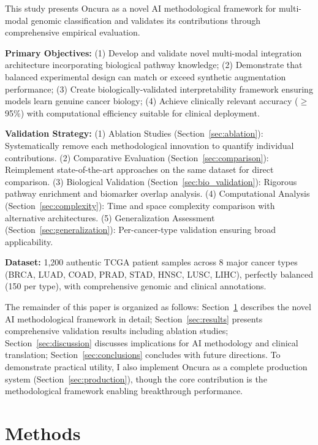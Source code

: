 \documentclass[manuscript, screen, review]{jair}
\begin{document}
This study presents Oncura as a novel AI methodological framework for multi-modal genomic classification and validates its contributions through comprehensive empirical evaluation.

\textbf{Primary Objectives:} (1) Develop and validate novel multi-modal integration architecture incorporating biological pathway knowledge; (2) Demonstrate that balanced experimental design can match or exceed synthetic augmentation performance; (3) Create biologically-validated interpretability framework ensuring models learn genuine cancer biology; (4) Achieve clinically relevant accuracy ($\geq$95\%) with computational efficiency suitable for clinical deployment.

\textbf{Validation Strategy:} (1) Ablation Studies (Section~\ref{sec:ablation}): Systematically remove each methodological innovation to quantify individual contributions. (2) Comparative Evaluation (Section~\ref{sec:comparison}): Reimplement state-of-the-art approaches on the same dataset for direct comparison. (3) Biological Validation (Section~\ref{sec:bio_validation}): Rigorous pathway enrichment and biomarker overlap analysis. (4) Computational Analysis (Section~\ref{sec:complexity}): Time and space complexity comparison with alternative architectures. (5) Generalization Assessment (Section~\ref{sec:generalization}): Per-cancer-type validation ensuring broad applicability.

\textbf{Dataset:} 1,200 authentic TCGA patient samples across 8 major cancer types (BRCA, LUAD, COAD, PRAD, STAD, HNSC, LUSC, LIHC), perfectly balanced (150 per type), with comprehensive genomic and clinical annotations.

The remainder of this paper is organized as follows: Section~\ref{sec:methods} describes the novel AI methodological framework in detail; Section~\ref{sec:results} presents comprehensive validation results including ablation studies; Section~\ref{sec:discussion} discusses implications for AI methodology and clinical translation; Section~\ref{sec:conclusions} concludes with future directions. To demonstrate practical utility, I also implement Oncura as a complete production system (Section~\ref{sec:production}), though the core contribution is the methodological framework enabling breakthrough performance.

\section{Methods}
\label{sec:methods}
\end{document}
